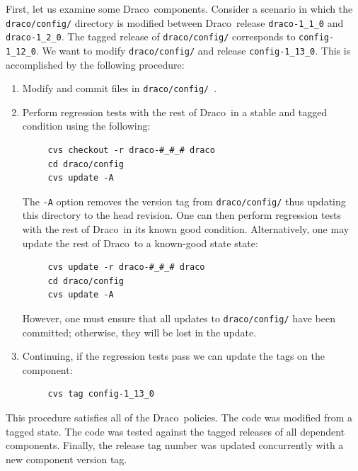 \documentclass[11pt]{nmemo}
\newcommand{\draco}{{\normalfont\normalsize\sffamily Draco}}
\begin{document}
First, let us examine some \draco\ components.  Consider a scenario in
which the \texttt{draco/config/} directory is modified between
\draco\ release \texttt{draco-1\_1\_0} and \texttt{draco-1\_2\_0}.
The tagged release of \texttt{draco/config/} corresponds to
\texttt{config-1\_12\_0}.  We want to modify \texttt{draco/config/}
and release \texttt{config-1\_13\_0}.  This is accomplished by the
following procedure:
\begin{enumerate}
\item Modify and commit files in \texttt{draco/config/}\ .
\item Perform regression tests with the rest of \draco\ in a stable
  and tagged condition using the following:
\begin{verbatim}
     cvs checkout -r draco-#_#_# draco
     cd draco/config
     cvs update -A
\end{verbatim}
  The \texttt{-A} option removes the version tag from
  \texttt{draco/config/} thus updating this directory to the head
  revision.  One can then perform regression tests with the rest of
  \draco\ in its known good condition.  Alternatively, one may update
  the rest of \draco\ to a known-good state state:
\begin{verbatim}
     cvs update -r draco-#_#_# draco
     cd draco/config
     cvs update -A
\end{verbatim}
  However, one must ensure that all updates to \texttt{draco/config/}
  have been committed; otherwise, they will be lost in the update.
\item Continuing, if the regression tests pass we can update the tags
  on the component:
\begin{verbatim}
     cvs tag config-1_13_0
\end{verbatim}
\end{enumerate}
This procedure satisfies all of the \draco\ policies.  The code was
modified from a tagged state.  The code was tested against the tagged
releases of all dependent components.  Finally, the release tag number
was updated concurrently with a new component version tag.
\end{document}
